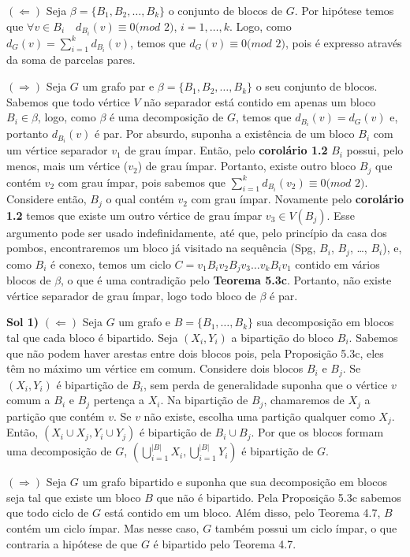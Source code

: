 
$(\Leftarrow)$ Seja $\beta = \{B_1, B_2, \ldots , B_k\}$ o conjunto de blocos
de $G$. Por hipótese temos que $\forall v \in B_i\quad d_{B_i}(v) \equiv 0 (mod$
$2)$, $i = 1, \ldots, k$. Logo, como $d_G(v) = \sum_{i = 1}^{k} d_{B_i}(v)$, 
temos que $d_G(v) \equiv 0 (mod$ $2)$, pois é expresso através da soma de 
parcelas pares.

$(\Rightarrow)$ Seja $G$ um grafo par e $\beta = \{B_1, B_2, \ldots , B_k\}$ 
o seu conjunto de blocos. Sabemos que todo vértice $V$ não separador está 
contido em apenas um bloco $B_i \in \beta$, logo, como $\beta$ é uma 
decomposição de $G$, temos que $d_{B_i}(v) = d_G(v)$ e, portanto $d_{B_i}(v)$ 
é par. Por absurdo, suponha a existência de um bloco $B_i$ com um vértice 
separador $v_1$ de grau ímpar. Então, pelo {\bf corolário 1.2} $B_i$ possui,
pelo menos, mais um vértice ($v_2$) de grau ímpar. Portanto, existe outro
bloco $B_j$ que contém $v_2$ com grau ímpar, pois sabemos que
$\sum_{i = 1}^{k} d_{B_i}(v_2) \equiv 0 (mod$ $2)$. Considere então, $B_j$
o qual contém $v_2$ com grau ímpar. Novamente pelo {\bf corolário 1.2} temos
que existe um outro vértice de grau ímpar $v_3 \in V(B_j)$. Esse argumento 
pode ser usado indefinidamente, até que, pelo princípio da casa dos pombos, 
encontraremos um bloco já visitado na sequência (Spg, $B_i$, $B_j$, \ldots, $B_i$),
e, como $B_i$ é conexo, temos um ciclo $C = v_1B_iv_2B_jv_3\ldots v_kB_iv_1$
contido em vários blocos de $\beta$, o que é uma contradição pelo 
{\bf Teorema 5.3c}. Portanto, não existe vértice separador de grau ímpar, logo
todo bloco de $\beta$ é par.

\fimprova

{\bf Sol 1)} $(\Leftarrow)$ Seja $G$ um grafo e $B = \{B_1, \dotsc, B_k\}$ sua
decomposição em blocos tal que cada bloco é bipartido. Seja $(X_i, Y_i)$ a
bipartição do bloco $B_i$. Sabemos que não podem haver arestas entre dois
blocos pois, pela Proposição 5.3c, eles têm no máximo um vértice em comum.
Considere dois blocos $B_i$ e $B_j$. Se $(X_i,Y_i)$ é bipartição de $B_i$, sem
perda de generalidade suponha que o vértice $v$ comum a $B_i$ e $B_j$ pertença
a $X_i$. Na bipartição de $B_j$, chamaremos de $X_j$ a partição que contém $v$.
Se $v$ não existe, escolha uma partição qualquer como $X_j$. Então, $(X_i \cup
X_j, Y_i \cup Y_j)$ é bipartição de $B_i \cup B_j$. Por que os blocos formam
uma decomposição de $G$, $(\bigcup_{i=1}^{|B|} X_i, \bigcup_{i=1}^{|B|} Y_i)$ é
bipartição de $G$.

$(\Rightarrow)$ Seja $G$ um grafo bipartido e suponha que sua decomposição em
blocos seja tal que existe um bloco $B$ que não é bipartido. Pela Proposição
5.3c sabemos que todo ciclo de $G$ está contido em um bloco. Além disso, pelo
Teorema 4.7, $B$ contém um ciclo ímpar. Mas nesse caso, $G$ também possui um
ciclo ímpar, o que contraria a hipótese de que $G$ é bipartido pelo Teorema
4.7.
\fimprova

